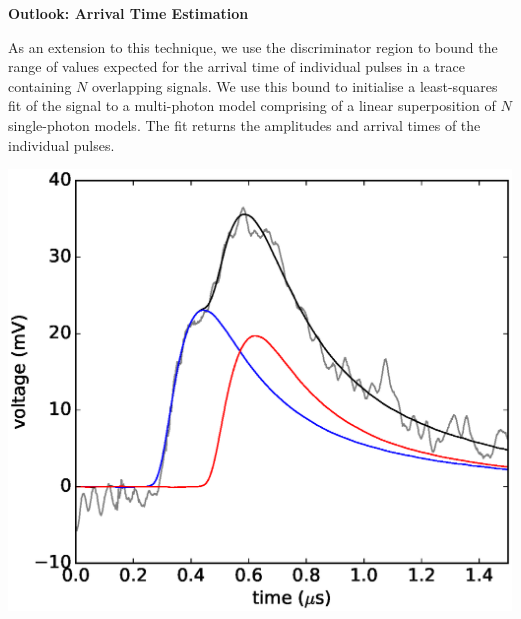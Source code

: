 \begin{center}
  \begin{center} {\bf \Large \textsf {Outlook: Arrival Time Estimation}}\end{center}
\end{center}
As an extension to this technique, we use the discriminator region to bound the range of values expected for the arrival time of individual pulses in a trace containing $N$ overlapping signals. 
%
We use this bound to initialise a least-squares fit of the signal to a multi-photon model comprising of a linear superposition of $N$ single-photon models.
%
The fit returns the amplitudes and arrival times of the individual pulses.
%
\begin{figurehere}
  \begin{minipage}{0.7\linewidth}
    \includegraphics[width=1\linewidth]{figures/mcmc_components_170ns/mcmc_fitted_components_170ns.eps}
  \end{minipage}
  \begin{minipage}{0.3\linewidth}

  \end{minipage}
\end{figurehere}